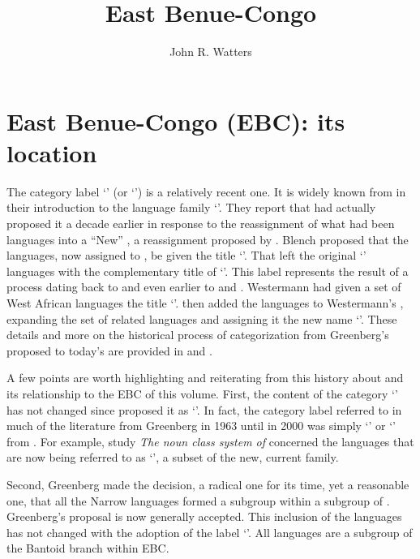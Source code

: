 \documentclass[output=paper]{langsci/langscibook}
\title{East Benue-Congo}
\author{%
John R. Watters  \affiliation{SIL International}  
}
\begin{document}
\label{sec:1}
\section{East Benue-Congo (EBC): its location}\label{sec:watters:1}
 
The category label ‘’ (or ‘’) is a relatively recent one. It is widely known from  \citet[30-36]{WilliamsonBlench2000} in their introduction to the language family ‘’. They report that \citet{Blench1989} had actually proposed it a decade earlier in response to the reassignment of what had been  languages into a “New” , a reassignment proposed by  \citet{BennettSterk1977}. Blench proposed that the  languages, now assigned to , be given the title ‘’. That left the original ‘’ languages with the complementary title of ‘’. This label represents the result of a process dating back to \citet{Greenberg1963} and even earlier to \citet{Westermann1927} and \citet{Johnston191922}. Westermann had given a set of West African languages the title ‘’. \citet{Greenberg1963} then added the  languages to Westermann’s , expanding the set of related languages and assigning it the new name ‘’. These details and more on the historical process of categorization from Greenberg’s proposed  to today’s  are provided in \citet[247-274]{Williamson1989} and \citet[30-36]{WilliamsonBlench2000}. 

A few points are worth highlighting and reiterating from this history about  and its relationship to the EBC of this volume. First, the content of the category ‘’ has not changed since \citet{Greenberg1963} proposed it as ‘’. In fact, the category label referred to in much of the literature from Greenberg in 1963 until \citeauthor{WilliamsonBlench2000} in 2000 was simply ‘’ or ‘’ from \citet{BennettSterk1977}. For example,  study \textit{The noun class system of } concerned the languages that are now being referred to as ‘’, a subset of the new, current  family.    

Second, Greenberg made the decision, a radical one for its time, yet a reasonable one, that all the Narrow  languages formed a subgroup within a subgroup of . Greenberg’s proposal is now generally accepted. This inclusion of the  languages has not changed with the adoption of the label ‘’. All  languages are a subgroup of the Bantoid branch within EBC.
\end{document}
